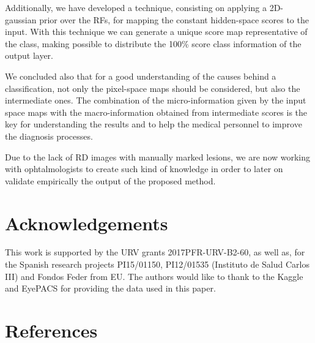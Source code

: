 \documentclass[review]{elsarticle}
\theoremstyle{definition} %
\theoremstyle{remark}
\begin{document}
Additionally, we have developed a technique, consisting on applying a 2D-gaussian prior over the RFs, for mapping the constant hidden-space scores to the input. With this technique we can generate a unique score map representative of the class, making possible to distribute the 100\% score class information of the output layer. 

We concluded also that for a good understanding of the causes behind a classification, not only the pixel-space maps should be considered, but also the intermediate ones. The combination of the micro-information given by the input space maps with the macro-information obtained from intermediate scores is the key for understanding the results and to help the medical personnel to improve the diagnosis processes.

Due to the lack of RD images with manually marked lesions, we are now working with ophtalmologists to create such kind of knowledge in order to later on validate empirically the output of the proposed method.

\section*{Acknowledgements}
This work is supported by the URV grants 2017PFR-URV-B2-60, as well as, for the Spanish research projects PI15/01150, PI12/01535 (Instituto de Salud Carlos III) and Fondos Feder from EU. The authors would like to thank to the Kaggle and EyePACS for providing the data used in this paper.

\section*{References}


\end{document}
